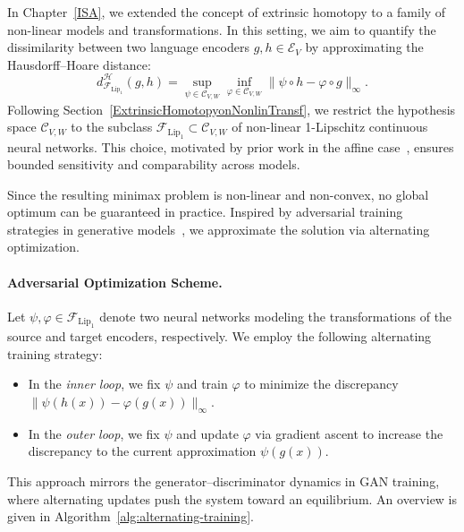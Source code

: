 In Chapter~\ref{ISA}, we extended the concept of extrinsic homotopy to a family of non-linear models and transformations.  
In this setting, we aim to quantify the dissimilarity between two language encoders \( g, h \in \mathcal{E}_V \) by approximating the Hausdorff–Hoare distance:
\[
	d_{\mathcal{F}_{\mathrm{Lip}_1}}^{\mathcal{H}}(g, h) = \sup_{\psi \in \mathcal{C}_{V,W}} \inf_{\varphi \in \mathcal{C}_{V,W}} \|\psi\circ h - \varphi \circ g\|_\infty.
\]
Following Section~\ref{ExtrinsicHomotopyonNonlinTransf}, we restrict the hypothesis space \( \mathcal{C}_{V,W} \) to the subclass \( \mathcal{F}_{\text{Lip}_1} \subset \mathcal{C}_{V,W} \) of non-linear 1-Lipschitz continuous neural networks.  
This choice, motivated by prior work in the affine case~\cite{chan_affine_2024}, ensures bounded sensitivity and comparability across models.

Since the resulting minimax problem is non-linear and non-convex, no global optimum can be guaranteed in practice.  
Inspired by adversarial training strategies in generative models~\cite{goodfellow_generative_2014}, we approximate the solution via alternating optimization.

\paragraph{Adversarial Optimization Scheme.}
Let \( \psi, \varphi \in \mathcal{F}_{\text{Lip}_1} \) denote two neural networks modeling the transformations of the source and target encoders, respectively.  
We employ the following alternating training strategy:
\begin{itemize}
    \item In the \emph{inner loop}, we fix \( \psi \) and train \( \varphi \) to minimize the discrepancy \( \|\psi(h(x)) - \varphi(g(x))\|_\infty \).
    \item In the \emph{outer loop}, we fix \( \psi \) and update \( \varphi \) via gradient ascent to increase the discrepancy to the current approximation \( \psi(g(x)) \).
\end{itemize}
This approach mirrors the generator–discriminator dynamics in GAN training, where alternating updates push the system toward an equilibrium.  
An overview is given in Algorithm~\ref{alg:alternating-training}.

